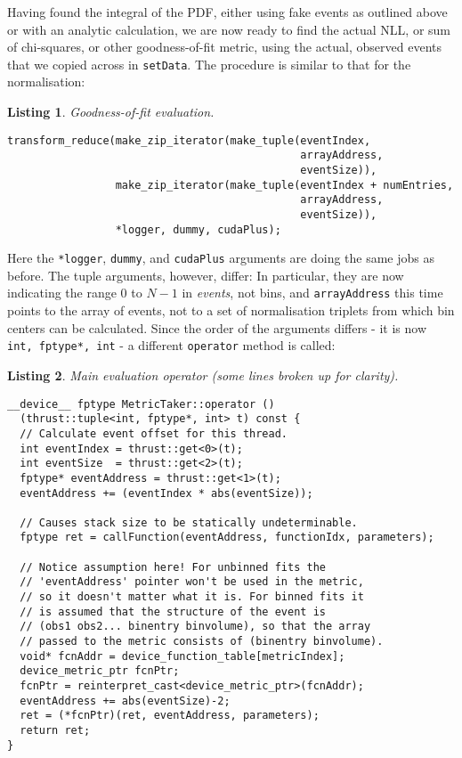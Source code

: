 \documentclass[12pt,pdflatex]{article}
\newtheorem{listing}{Listing}
\begin{document}
Having found the integral of the PDF, either using fake events as outlined above
or with an analytic calculation, we are now ready to find the actual NLL, or sum of
chi-squares, or other goodness-of-fit metric, using the actual, observed events that
we copied across in \texttt{setData}. The procedure is similar to that for the normalisation:
\begin{listing}
\label{listing:nlleval}
Goodness-of-fit evaluation.

\begin{verbatim}
transform_reduce(make_zip_iterator(make_tuple(eventIndex, 
                                              arrayAddress, 
                                              eventSize)),
                 make_zip_iterator(make_tuple(eventIndex + numEntries, 
                                              arrayAddress, 
                                              eventSize)),
                 *logger, dummy, cudaPlus);   
\end{verbatim}
\end{listing}

Here the \verb|*logger|, \verb|dummy|, and \verb|cudaPlus| arguments are doing
the same jobs as before. The tuple arguments, however, differ: In particular,
they are now indicating the range 0 to $N-1$ in \emph{events}, not bins, and
\verb|arrayAddress| this time points to the array of events, not to a set of 
normalisation triplets from which bin centers can be calculated. Since the order
of the arguments differs - it is now \verb|int, fptype*, int| - a different 
\texttt{operator} method is called: 
\begin{listing}
\label{listing:maineval} 
Main evaluation operator (some lines broken up for clarity). 

\begin{verbatim}
__device__ fptype MetricTaker::operator () 
  (thrust::tuple<int, fptype*, int> t) const {
  // Calculate event offset for this thread. 
  int eventIndex = thrust::get<0>(t);
  int eventSize  = thrust::get<2>(t);
  fptype* eventAddress = thrust::get<1>(t);
  eventAddress += (eventIndex * abs(eventSize)); 

  // Causes stack size to be statically undeterminable.
  fptype ret = callFunction(eventAddress, functionIdx, parameters);

  // Notice assumption here! For unbinned fits the 
  // 'eventAddress' pointer won't be used in the metric, 
  // so it doesn't matter what it is. For binned fits it 
  // is assumed that the structure of the event is 
  // (obs1 obs2... binentry binvolume), so that the array
  // passed to the metric consists of (binentry binvolume). 
  void* fcnAddr = device_function_table[metricIndex];
  device_metric_ptr fcnPtr;
  fcnPtr = reinterpret_cast<device_metric_ptr>(fcnAddr);
  eventAddress += abs(eventSize)-2;
  ret = (*fcnPtr)(ret, eventAddress, parameters);
  return ret; 
}
\end{verbatim}
\end{listing}
\end{document}
